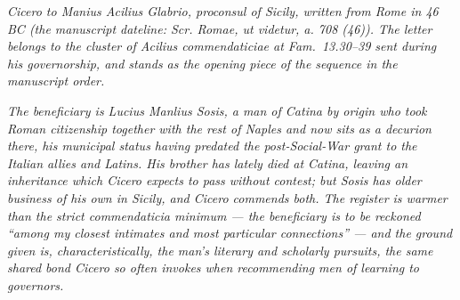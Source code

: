 
\textit{Cicero to Manius Acilius Glabrio, proconsul of
Sicily, written from Rome in 46 BC (the manuscript
dateline: \textit{Scr. Romae, ut videtur, a. 708 (46)}).
The letter belongs to the cluster of Acilius
commendaticiae at Fam.\ 13.30--39 sent during his
governorship, and stands as the opening piece of the
sequence in the manuscript order.}

\textit{The beneficiary is Lucius Manlius Sosis, a man of
Catina by origin who took Roman citizenship together
with the rest of Naples and now sits as a decurion
there, his municipal status having predated the
post-Social-War grant to the Italian allies and Latins.
His brother has lately died at Catina, leaving an
inheritance which Cicero expects to pass without
contest; but Sosis has older business of his own in
Sicily, and Cicero commends both. The register is
warmer than the strict commendaticia minimum --- the
beneficiary is to be reckoned ``among my closest
intimates and most particular connections'' --- and the
ground given is, characteristically, the man's literary
and scholarly pursuits, the same shared bond Cicero so
often invokes when recommending men of learning to
governors.}
